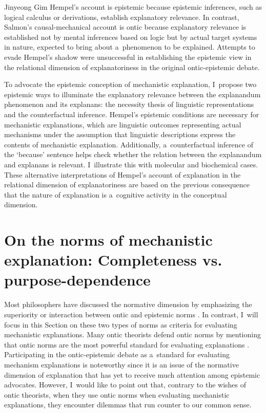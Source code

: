 \begin{artengenv}{Jinyeong Gim}
Hempel's account is epistemic because epistemic inferences, such as logical calculus or derivations, establish explanatory relevance. In contrast, Salmon's causal-mechanical account is ontic because explanatory relevance is established not by mental inferences based on logic but by actual target systems in nature, expected to bring about a~phenomenon to be explained. Attempts to evade Hempel's shadow were unsuccessful in establishing the epistemic view in the relational dimension of explanatoriness in the original ontic-epistemic debate.

To advocate the epistemic conception of mechanistic explanation, I~propose two epistemic ways to illuminate the explanatory relevance between the explanandum phenomenon and its explanans: the necessity thesis of linguistic representations and the counterfactual inference. Hempel's epistemic conditions are necessary for mechanistic explanations, which are linguistic outcomes representing actual mechanisms under the assumption that linguistic descriptions express the contents of mechanistic explanation. Additionally, a~counterfactual inference of the ‘because' sentence helps check whether the relation between the explanandum and explanans is relevant. I~illustrate this with molecular and biochemical cases. These alternative interpretations of Hempel's account of explanation in the relational dimension of explanatoriness are based on the previous consequence that the nature of explanation is a~cognitive activity in the conceptual dimension.

\section{On the norms of mechanistic explanation: Completeness vs. purpose-dependence}
\enlargethispage{1.5\baselineskip}
Most philosophers have discussed the normative dimension by emphasizing the superiority or interaction between ontic and epistemic norms
\parencites[][]{kaplan_explanatory_2011}[][]{illari_mechanistic_2013}[][]{van_eck_reconciling_2015}[][]{sheredos_re-reconciling_2016}. %
 In contrast, I~will focus in this Section on these two types of norms as criteria for evaluating mechanistic explanations. Many ontic theorists defend ontic norms by mentioning that ontic norms are the most powerful standard for evaluating explanations 
\parencites[see][]{kaiser_ontic_2014}[][]{povich_minimal_2018}. %
 Participating in the ontic-epistemic debate as a~standard for evaluating mechanism explanations is noteworthy since it is an issue of the normative dimension of explanation that has yet to receive much attention among epistemic advocates. However, I~would like to point out that, contrary to the wishes of ontic theorists, when they use ontic norms when evaluating mechanistic explanations, they encounter dilemmas that run counter to our common sense.


\end{artengenv}
